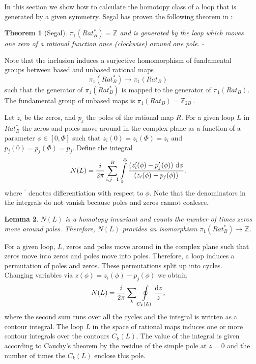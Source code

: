 \documentclass[a4paper,12pt]{article}
\newtheorem {theorem}{Theorem}[section]
\newtheorem {lemma}[theorem]{Lemma}
\begin{document}
In this section we show how to calculate the homotopy class of a loop
that is generated by a given symmetry.
%
Segal has proven the following theorem in \cite[Proposition 
6.4]{Segal:1979}:
%
\begin{theorem}[Segal]
$\pi_1(Rat^*_B) = {\mathbb Z}$ and is generated by the loop which moves one 
zero of a rational function once (clockwise) around one pole. \hfill 
$\square$
\end{theorem}
%
Note that the inclusion induces a surjective homomorphism of fundamental 
groups between based and unbased rational maps
%
\begin{equation}
\pi_1(Rat^*_B) \to \pi_1(Rat_B)
\end{equation}
%
such that the generator of $\pi_1(Rat^*_B)$ is mapped to the generator of 
$\pi_1(Rat_B)$. The fundamental group of unbased maps is $\pi_1(Rat_B) = 
{\mathbb Z}_{2B}$ \cite{Epshtein:1973,Segal:1979}.


Let $z_i$ be the zeros, and $p_j$ the poles of 
the rational map $R$. For a given loop $L$ in $Rat^*_B$ the zeros and 
poles move around in the complex plane as a function of a parameter $\phi \in 
[0,\Phi]$ such that $z_i(0) = z_i(\Phi) = z_i$ and $p_j(0) = p_j(\Phi) = p_j$. 
Define the integral  
%
\begin{equation}
\label{def:N}
N(L) = \frac{i}{2 \pi} \sum\limits_{i,j=1}^{B}
\int\limits_0^{\Phi}
\frac{(z_i^\prime(\phi) - p_j^\prime(\phi)) ~{\rm d} \phi}
{(z_i(\phi) - p_j(\phi))}.
\end{equation}
%
where ${}^\prime$ denotes differentiation with respect to $\phi$.
Note that the denominators in the integrals do not vanish because poles 
and zeros cannot coalesce. 
%
\begin{lemma}
\label{l:iso}
$N(L)$ is a homotopy invariant and counts the number of times zeros 
move around poles. Therefore, $N(L)$ provides an isomorphism $\pi_1(Rat_B^*) 
\to {\mathbb Z}$.
\end{lemma}
%
%
For a given loop, $L$, zeros and poles move around in the complex plane 
such that zeros move into zeros and poles move into poles. Therefore, a 
loop induces a permutation of poles and zeros. These permutations 
split up into cycles. Changing variables via $z(\phi) = z_i(\phi) - 
p_j(\phi)$ we obtain
%
\begin{equation}
N(L) = \frac{i}{2 \pi} \sum\limits_{k}
\oint\limits_{C_k(L)} \frac{{\rm d}z}{z},
\end{equation}
%
where the second sum runs over all the cycles and 
the integral is written as a contour integral.
The loop $L$ in the space
of rational maps induces one or more contour integrals over the contours 
$C_k(L)$.
The value of the integral is given according to Cauchy's theorem by 
the residue of the simple pole at $z=0$ and the number of times the 
$C_k(L)$ enclose this pole.
\end{document}
